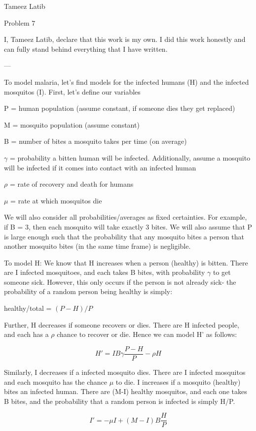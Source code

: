 \documentclass{article}
\begin{document}
Tameez Latib

Problem 7

I, Tameez Latib, declare that this work is my own. I did this work honestly and can fully stand behind everything that I have written.

---

To model malaria, let's find models for the infected humans (H) and the infected mosquitos (I). First, let's define our variables 

P = human population (assume constant, if someone dies they get replaced)

M = mosquito population (assume constant)

B = number of bites a mosquito takes per time (on average)

$\gamma$ = probability a bitten human will be infected. Additionally, assume a mosquito will be infected if it comes into contact with an infected human

$\rho$ = rate of recovery and death for humans

$\mu$ = rate at which mosquitos die

We will also consider all probabilities/averages as fixed certainties. For example, if B = 3, then each mosquito will take exactly 3 bites. 
We will also assume that P is large enough such that the probability that any mosquito bites a person that another mosquito bites (in the same time frame) is negligible. 

To model H: We know that H increases when a person (healthy) is bitten. There are I infected mosquitoes, and each takes B bites, with probability $\gamma$ to get someone sick. However, this only occurs if the person is not already sick- the probability of a random person being healthy is simply: 

healthy/total = $(P-H)/P$


Further, H decreases if someone recovers or dies. There are H infected people, and each has a $\rho$ chance to recover or die. 
Hence we can model H' as follows:

$$H' = IB \gamma \frac{P-H}{P} - \rho H$$

Similarly, I decreases if a infected mosquito dies. There are I infected mosquitos and each mosquito has the chance $\mu$ to die. I increases if a mosquito (healthy) bites an infected human. There are (M-I) healthy mosquitos, and each one takes B bites, and the probability that a random person is infected is simply H/P. 

$$I' = - \mu I + (M-I)B \frac{H}{P}$$
\end{document}
